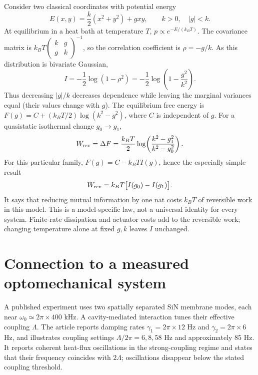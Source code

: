 \documentclass[9pt]{article}
\begin{document}
Consider two classical coordinates with potential energy
\begin{equation}
 E(x,y)=\frac{k}{2}(x^2+y^2)+gxy,\qquad k>0,\quad |g|<k.
\end{equation}
At equilibrium in a heat bath at temperature $T$, $p\propto e^{-E/(k_BT)}$. The covariance matrix is $k_BT\begin{pmatrix}k&g\\g&k\end{pmatrix}^{-1}$, so the correlation coefficient is $\rho=-g/k$. As this distribution is bivariate Gaussian,
\begin{equation}
 I=-\frac12\log(1-\rho^2)=-\frac12\log\!\left(1-\frac{g^2}{k^2}\right).
\end{equation}
Thus decreasing $|g|/k$ decreases dependence while leaving the marginal variances equal (their values change with $g$). The equilibrium free energy is $F(g)=C+(k_BT/2)\log(k^2-g^2)$, where $C$ is independent of $g$. For a quasistatic isothermal change $g_0\to g_1$,
\begin{equation}
 W_{\rm rev}=\Delta F=\frac{k_BT}{2}\log\!\left(\frac{k^2-g_1^2}{k^2-g_0^2}\right).
\end{equation}
For this particular family, $F(g)=C-k_BT I(g)$, hence the especially simple result
\begin{equation}
 W_{\rm rev}=k_BT\bigl[I(g_0)-I(g_1)\bigr].
\end{equation}
It says that reducing mutual information by one nat costs $k_BT$ of reversible work in this model. This is a model-specific law, not a universal identity for every system. Finite-rate dissipation and actuator costs add to the reversible work; changing temperature alone at fixed $g,k$ leaves $I$ unchanged.

\section{Connection to a measured optomechanical system}
A published experiment uses two spatially separated SiN membrane modes, each near $\omega_0\simeq2\pi\times400$ kHz. A cavity-mediated interaction tunes their effective coupling $\Lambda$. The article reports damping rates $\gamma_1=2\pi\times12$ Hz and $\gamma_2=2\pi\times6$ Hz, and illustrates coupling settings $\Lambda/2\pi=6,8,58$ Hz and approximately $85$ Hz. It reports coherent heat-flux oscillations in the strong-coupling regime and states that their frequency coincides with $2\Lambda$; oscillations disappear below the stated coupling threshold.\cite{yang2020,xuereb2015}
\end{document}
